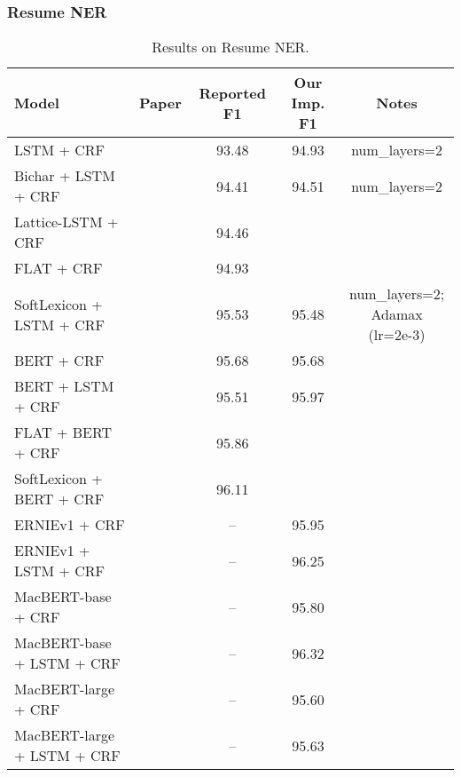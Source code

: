 \documentclass{article}
\begin{document}
\subsubsection{Resume NER}
\begin{table}[H]
    \centering
    \begin{tabular}{lcccc}
    \toprule
    Model & Paper & Reported F1 & Our Imp. F1 & Notes \\
    \midrule
    LSTM + CRF                  & \citet{zhang2018chinese} & 93.48 & 94.93 & num\_layers=2 \\
    Bichar + LSTM + CRF         & \citet{zhang2018chinese} & 94.41 & 94.51 & num\_layers=2 \\
    Lattice-LSTM + CRF          & \citet{zhang2018chinese} & 94.46 \\
    FLAT + CRF                  & \citet{li2020flat}       & 94.93 \\
    SoftLexicon + LSTM + CRF    & \citet{ma2020simplify}   & 95.53 & 95.48 & \makecell{num\_layers=2; \\Adamax (lr=2e-3)} \\
    \midrule
    BERT + CRF                  & \citet{ma2020simplify}   & 95.68 & 95.68 \\
    BERT + LSTM + CRF           & \citet{ma2020simplify}   & 95.51 & 95.97 \\
    FLAT + BERT + CRF           & \citet{li2020flat}       & 95.86 \\
    SoftLexicon + BERT + CRF    & \citet{ma2020simplify}   & 96.11 \\
    \midrule
    ERNIEv1 + CRF               & \citet{sun2019ernie}     & --    & 95.95 \\
    ERNIEv1 + LSTM + CRF        & \citet{sun2019ernie}     & --    & 96.25 \\
    \midrule
    MacBERT-base + CRF          & \citet{cui2020revisiting} & --    & 95.80 \\
    MacBERT-base + LSTM + CRF   & \citet{cui2020revisiting} & --    & 96.32 \\
    MacBERT-large + CRF         & \citet{cui2020revisiting} & --    & 95.60 \\
    MacBERT-large + LSTM + CRF  & \citet{cui2020revisiting} & --    & 95.63 \\
    \bottomrule
    \end{tabular}
    \caption{Results on Resume NER.}
\end{table}
\end{document}
